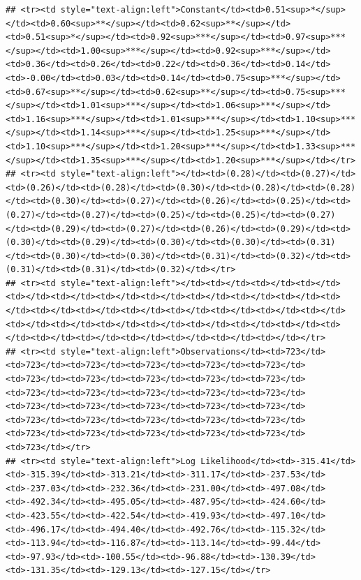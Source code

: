 \documentclass[
]{article}
\begin{document}
\begin{verbatim}
## <tr><td style="text-align:left">Constant</td><td>0.51<sup>*</sup></td><td>0.60<sup>**</sup></td><td>0.62<sup>**</sup></td><td>0.51<sup>*</sup></td><td>0.92<sup>***</sup></td><td>0.97<sup>***</sup></td><td>1.00<sup>***</sup></td><td>0.92<sup>***</sup></td><td>0.36</td><td>0.26</td><td>0.22</td><td>0.36</td><td>0.14</td><td>-0.00</td><td>0.03</td><td>0.14</td><td>0.75<sup>***</sup></td><td>0.67<sup>**</sup></td><td>0.62<sup>**</sup></td><td>0.75<sup>***</sup></td><td>1.01<sup>***</sup></td><td>1.06<sup>***</sup></td><td>1.16<sup>***</sup></td><td>1.01<sup>***</sup></td><td>1.10<sup>***</sup></td><td>1.14<sup>***</sup></td><td>1.25<sup>***</sup></td><td>1.10<sup>***</sup></td><td>1.20<sup>***</sup></td><td>1.33<sup>***</sup></td><td>1.35<sup>***</sup></td><td>1.20<sup>***</sup></td></tr>
## <tr><td style="text-align:left"></td><td>(0.28)</td><td>(0.27)</td><td>(0.26)</td><td>(0.28)</td><td>(0.30)</td><td>(0.28)</td><td>(0.28)</td><td>(0.30)</td><td>(0.27)</td><td>(0.26)</td><td>(0.25)</td><td>(0.27)</td><td>(0.27)</td><td>(0.25)</td><td>(0.25)</td><td>(0.27)</td><td>(0.29)</td><td>(0.27)</td><td>(0.26)</td><td>(0.29)</td><td>(0.30)</td><td>(0.29)</td><td>(0.30)</td><td>(0.30)</td><td>(0.31)</td><td>(0.30)</td><td>(0.30)</td><td>(0.31)</td><td>(0.32)</td><td>(0.31)</td><td>(0.31)</td><td>(0.32)</td></tr>
## <tr><td style="text-align:left"></td><td></td><td></td><td></td><td></td><td></td><td></td><td></td><td></td><td></td><td></td><td></td><td></td><td></td><td></td><td></td><td></td><td></td><td></td><td></td><td></td><td></td><td></td><td></td><td></td><td></td><td></td><td></td><td></td><td></td><td></td><td></td><td></td></tr>
## <tr><td style="text-align:left">Observations</td><td>723</td><td>723</td><td>723</td><td>723</td><td>723</td><td>723</td><td>723</td><td>723</td><td>723</td><td>723</td><td>723</td><td>723</td><td>723</td><td>723</td><td>723</td><td>723</td><td>723</td><td>723</td><td>723</td><td>723</td><td>723</td><td>723</td><td>723</td><td>723</td><td>723</td><td>723</td><td>723</td><td>723</td><td>723</td><td>723</td><td>723</td><td>723</td></tr>
## <tr><td style="text-align:left">Log Likelihood</td><td>-315.41</td><td>-315.39</td><td>-313.21</td><td>-311.17</td><td>-237.53</td><td>-237.03</td><td>-232.36</td><td>-231.00</td><td>-497.08</td><td>-492.34</td><td>-495.05</td><td>-487.95</td><td>-424.60</td><td>-423.55</td><td>-422.54</td><td>-419.93</td><td>-497.10</td><td>-496.17</td><td>-494.40</td><td>-492.76</td><td>-115.32</td><td>-113.94</td><td>-116.87</td><td>-113.14</td><td>-99.44</td><td>-97.93</td><td>-100.55</td><td>-96.88</td><td>-130.39</td><td>-131.35</td><td>-129.13</td><td>-127.15</td></tr>

\end{verbatim}
\end{document}
